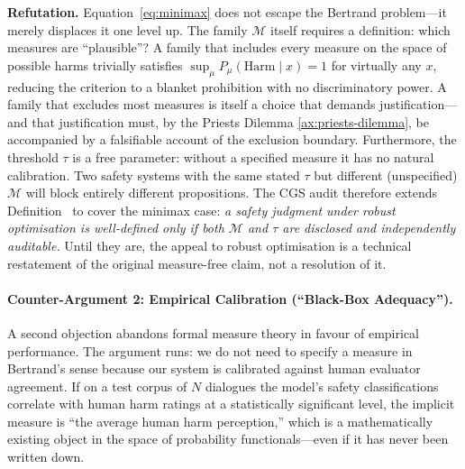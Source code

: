 \documentclass[11pt,a4paper]{article}
\theoremstyle{definition}
\theoremstyle{plain}
\theoremstyle{remark}
\begin{document}
\textbf{Refutation.}
Equation~\eqref{eq:minimax} does not escape the Bertrand problem---it merely displaces it
one level up.
The family $\mathcal{M}$ itself requires a definition: which measures are
``plausible''?  A family that includes every measure on the space of possible harms trivially
satisfies $\sup_{\mu} P_\mu(\mathrm{Harm}\mid x)=1$ for virtually any $x$, reducing the
criterion to a blanket prohibition with no discriminatory power.
A family that excludes most measures is itself a choice that demands justification---and that
justification must, by the Priests Dilemma \cref{ax:priests-dilemma}, be accompanied by a falsifiable
account of the exclusion boundary.
Furthermore, the threshold $\tau$ is a free parameter: without a specified measure it has no
natural calibration.  Two safety systems with the same stated $\tau$ but different (unspecified)
$\mathcal{M}$ will block entirely different propositions.
The CGS audit therefore extends Definition~ to cover the minimax case:
\emph{a safety judgment under robust optimisation is well-defined only if both $\mathcal{M}$ and
$\tau$ are disclosed and independently auditable.}
Until they are, the appeal to robust optimisation is a technical restatement of the original
measure-free claim, not a resolution of it.

\paragraph{Counter-Argument 2: Empirical Calibration (``Black-Box Adequacy'').}
A second objection abandons formal measure theory in favour of empirical performance.
The argument runs: we do not need to specify a measure in Bertrand's sense because our
system is calibrated against human evaluator agreement.  If on a test corpus of $N$ dialogues
the model's safety classifications correlate with human harm ratings at a statistically
significant level, the implicit measure is ``the average human harm perception,'' which
is a mathematically existing object in the space of probability functionals---even if it
has never been written down.
\end{document}
